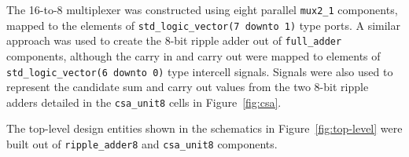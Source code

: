 \documentclass[a4paper,11pt]{article}
\begin{document}
\begin{center}
	\hspace{-\textwidth}%
	\begin{minipage}{0.6\textwidth}
		
	\end{minipage}%
	\hspace{2em}%
	\begin{minipage}{0.51\textwidth}
		
	\end{minipage}%
	\hspace{-\textwidth}

\end{center}

The 16-to-8 multiplexer was constructed using eight parallel \texttt{mux2\_1} components, mapped to the elements of \texttt{std\_logic\_vector(7 downto 1)} type ports. A similar approach was used to create the 8-bit ripple adder out of \texttt{full\_adder} components, although the carry in and carry out were mapped to elements of \texttt{std\_logic\_vector(6 downto 0)} type intercell signals. Signals were also used to represent the candidate sum and carry out values from the two 8-bit ripple adders detailed in the \texttt{csa\_unit8} cells in Figure~\ref{fig:csa}.

The top-level design entities shown in the schematics in Figure~\ref{fig:top-level} were built out of \texttt{ripple\_adder8} and \texttt{csa\_unit8} components.
\end{document}
